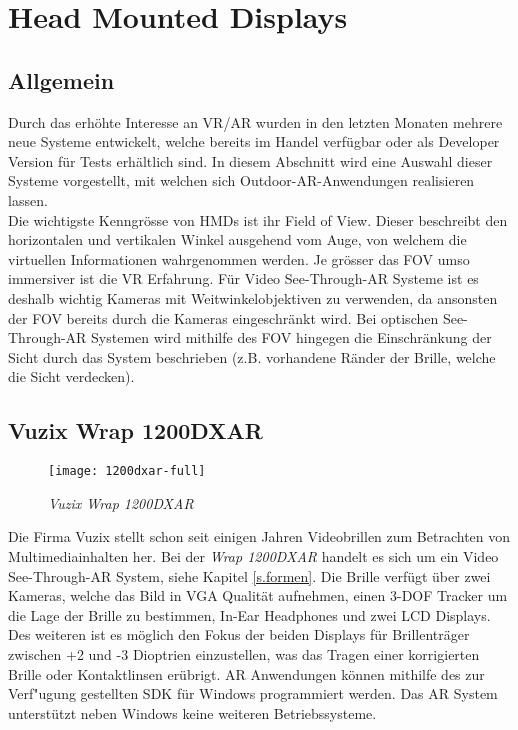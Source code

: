 \section{Head Mounted Displays}\label{s.displays}
\subsection*{Allgemein}
Durch das erhöhte Interesse an VR/AR wurden in den letzten Monaten mehrere neue Systeme entwickelt, welche bereits im Handel verfügbar oder als Developer Version für Tests erhältlich sind. In diesem Abschnitt wird eine Auswahl dieser Systeme vorgestellt, mit welchen sich Outdoor-AR-Anwendungen realisieren lassen.\\[6pt]
Die wichtigste Kenngrösse von HMDs ist ihr Field of View. Dieser beschreibt den horizontalen und vertikalen Winkel ausgehend vom Auge, von welchem die virtuellen Informationen wahrgenommen werden. Je grösser das FOV umso immersiver ist die VR Erfahrung. Für Video See-Through-AR Systeme ist es deshalb wichtig Kameras mit Weitwinkelobjektiven zu verwenden, da ansonsten der FOV bereits durch die Kameras eingeschränkt wird. Bei optischen See-Through-AR Systemen wird mithilfe des FOV hingegen die Einschränkung der Sicht durch das System beschrieben (z.B. vorhandene Ränder der Brille, welche die Sicht verdecken).\cite[S.~142~ff.]{doerner13}
\subsection*{Vuzix Wrap 1200DXAR}
\begin{wrapfigure}{r}{0.5\textwidth}
	\vspace{-20pt}
	\begin{center}
		\texttt{[image: 1200dxar-full]}
	\end{center}
	\vspace{-15pt}
	\caption{\textit{Vuzix Wrap 1200DXAR}}\label{vuzixgraphic}
	\vspace{-12pt}
\end{wrapfigure}
Die Firma Vuzix stellt schon seit einigen Jahren Videobrillen zum Betrachten von Multimediainhalten her. Bei der \textit{Wrap 1200DXAR} handelt es sich um ein Video See-Through-AR System, siehe Kapitel \ref{s.formen}. Die Brille verfügt über zwei Kameras, welche das Bild in VGA Qualität aufnehmen, einen 3-DOF Tracker um die Lage der Brille zu bestimmen, In-Ear Headphones und zwei LCD Displays. Des weiteren ist es möglich den Fokus der beiden Displays für Brillenträger zwischen +2 und -3 Dioptrien einzustellen, was das Tragen einer korrigierten Brille oder Kontaktlinsen erübrigt. AR Anwendungen können mithilfe des zur Verf"ugung gestellten SDK für Windows programmiert werden. Das AR System unterstützt neben Windows keine weiteren Betriebssysteme.\cite{website:vuzix}
